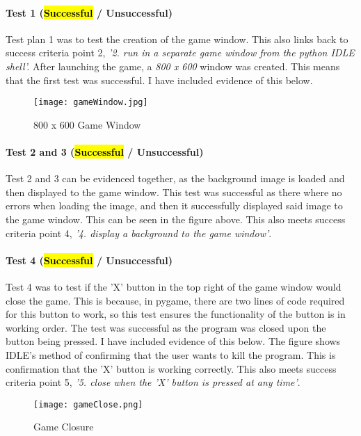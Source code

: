 \documentclass[12pt]{report}
\begin{document}
\pagebreak

\paragraph{Test 1 (\hl{Successful} / Unsuccessful)}
Test plan 1 was to test the creation of the game window. This also links back to success criteria point 2, \textit{'2.  run in a separate game window from the python IDLE shell'.} After launching the game, a \textit{800 x 600} window was created. This means that the first test was successful. I have included evidence of this below.

\begin{figure}[H]
    \centering
    \texttt{[image: gameWindow.jpg]}
    \caption{800 x 600 Game Window}
    \label{fig1}
\end{figure}

\paragraph{Test 2 and 3 (\hl{Successful} / Unsuccessful)}
Test 2 and 3 can be evidenced together, as the background image is loaded and then displayed to the game window. This test was successful as there where no errors when loading the image, and then it successfully displayed said image to the game window. This can be seen in the figure above. This also meets success criteria point 4, \textit{'4. display a background to the game window'}.

\pagebreak

\paragraph{Test 4 (\hl{Successful} / Unsuccessful)}
Test 4 was to test if the 'X' button in the top right of the game window would close the game. This is because, in pygame, there are two lines of code required for this button to work, so this test ensures the functionality of the button is in working order. The test was successful as the program was closed upon the button being pressed. I have included evidence of this below. The figure shows IDLE's method of confirming that the user wants to kill the program. This is confirmation that the 'X' button is working correctly. This also meets success criteria point 5, \textit{'5. close when the ’X’ button is pressed at any time'}.

\begin{figure}[H]
    \centering
    \texttt{[image: gameClose.png]}
    \caption{Game Closure}
    \label{fig2}
\end{figure}
\end{document}
